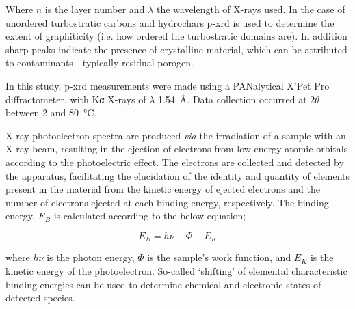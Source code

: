 Where $n$ is the layer number and $\lambda$ the wavelength of X-rays used.\citep{woolfson1997introduction} In the case of unordered \glspl{turbostratic carbon} and \glspl{hydrochar} \acrshort{p-xrd} is used to determine the extent of graphiticity (i.e. how ordered the turbostratic domains are). In addition sharp peaks indicate the presence of crystalline material, which can be attributed to contaminants - typically residual \gls{porogen}.

In this study, \acrshort{p-xrd} measurements were made using a PANalytical X’Pet Pro diffractometer, with K\textgreek{α} X-rays of $\lambda$ \qty{1.54}{\angstrom}. Data collection occurred at $2\theta$ between \num{2} and \qty{80}{\degreeCelsius}.

X-ray photoelectron spectra are produced \textit{via} the irradiation of a sample with an X-ray beam, resulting in the ejection of electrons from low energy atomic orbitals according to the photoelectric effect\citep{richardson1912liii}. The electrons are collected and detected by the apparatus, facilitating the elucidation of the identity and quantity of elements present in the material from the kinetic energy of ejected electrons and the number of electrons ejected at each binding energy, respectively. The binding energy, $E_B$ is calculated according to the below equation;

\begin{equation}
    E_B = h\nu - \Phi - E_K
\end{equation}

where $h\nu$ is the photon energy, $\Phi$ is the sample’s work function, and $E_K$ is the kinetic energy of the photoelectron. So-called `shifting' of elemental characteristic binding energies can be used to determine chemical and electronic states of detected species.\citep{moulder1995handbook}

